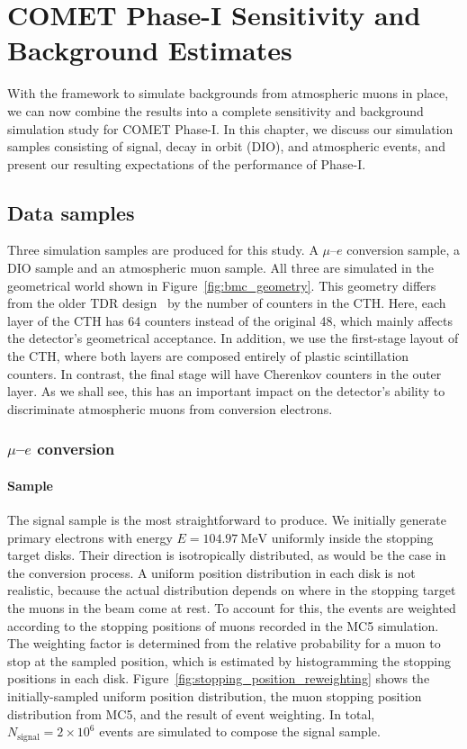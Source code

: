 \chapter{COMET Phase-I Sensitivity and Background Estimates}

With the framework to simulate backgrounds from atmospheric muons in place, we
can now combine the results into a complete sensitivity and background
simulation study for COMET Phase-I. In this chapter, we discuss our simulation
samples consisting of signal, decay in orbit (DIO), and atmospheric events, and
present our resulting expectations of the performance of Phase-I.

\section{Data samples}
Three simulation samples are produced for this study. A $\mu$--$e$ conversion
sample, a DIO sample and an atmospheric muon sample. All three are simulated in
the geometrical world shown in Figure~\ref{fig:bmc_geometry}. This geometry
differs from the older TDR design~\cite{the_comet_collaboration_comet_2020} by
the number of counters in the CTH. Here, each layer of the CTH has 64 counters
instead of the original 48, which mainly affects the detector's geometrical
acceptance. In addition, we use the first-stage layout of the CTH, where both
layers are composed entirely of plastic scintillation counters. In contrast, the
final stage will have Cherenkov counters in the outer layer. As we shall see,
this has an important impact on the detector's ability to discriminate
atmospheric muons from conversion electrons.

\subsection{\texorpdfstring{$\mu$--$e$}{Muon to electron} conversion} 

\subsubsection{Sample}

The signal sample is the most straightforward to produce. We initially generate
primary electrons with energy $E=\SI{104.97}{\MeV}$ uniformly inside the
stopping target disks. Their direction is isotropically distributed, as would be
the case in the conversion process. A uniform position distribution in each disk
is not realistic, because the actual distribution depends on where in the
stopping target the muons in the beam come at rest. To account for this, the
events are weighted according to the stopping positions of muons recorded in the
MC5 simulation. The weighting factor is determined from the relative probability
for a muon to stop at the sampled position, which is estimated by histogramming
the stopping positions in each disk.
Figure~\ref{fig:stopping_position_reweighting} shows the initially-sampled
uniform position distribution, the muon stopping position distribution from MC5,
and the result of event weighting. In total, $N_\mathrm{signal} =
2\times 10^6$ events are simulated to compose the signal sample.

